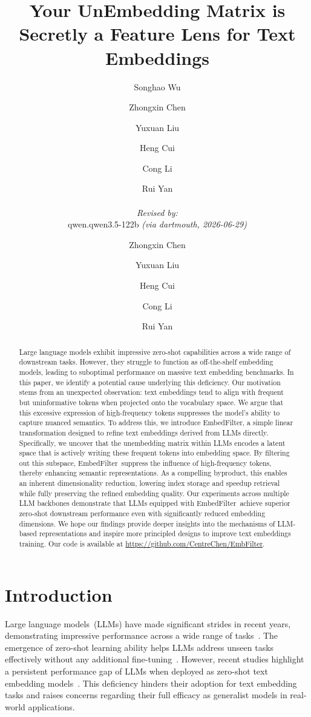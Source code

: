 \documentclass{llmxive}
\title{Your UnEmbedding Matrix is Secretly a Feature Lens for Text Embeddings}
\author{Songhao Wu \and Zhongxin Chen \and Yuxuan Liu \and Heng Cui \and Cong Li \and Rui Yan
  \par\hrule\par
  \textit{Revised by:}\\
  qwen.qwen3.5-122b \textit{(via dartmouth, 2026-06-29)} \and Zhongxin Chen \and Yuxuan Liu \and Heng Cui \and Cong Li \and Rui Yan}
\providecommand{\name}{EmbedFilter}
\begin{document}
\maketitle
\begin{abstract}
Large language models exhibit impressive zero-shot capabilities across a wide range of downstream tasks.
However, they struggle to function as off-the-shelf embedding models, leading to suboptimal performance on massive text embedding benchmarks.
In this paper, we identify a potential cause underlying this deficiency.
Our motivation stems from an unexpected observation: text embeddings tend to align with frequent but uninformative tokens when projected onto the vocabulary space. 
We argue that this excessive expression of high-frequency tokens suppresses the model's ability to capture nuanced semantics.
To address this, we introduce \name, a simple linear transformation designed to refine text embeddings derived from LLMs directly.
Specifically, we uncover that the unembedding matrix within LLMs encodes a latent space that is actively writing these frequent tokens into embedding space.
By filtering out this subspace, \name\ suppress the influence of high-frequency tokens, thereby enhancing semantic representations.
As a compelling byproduct, this enables an inherent dimensionality reduction, lowering index storage and speedup retrieval while fully preserving the refined embedding quality.
Our experiments across multiple LLM backbones demonstrate that LLMs equipped with \name\ achieve superior  zero-shot downstream performance even with significantly reduced embedding dimensions.
We hope our findings provide deeper insights into the mechanisms of LLM-based representations and inspire more principled designs to improve text embeddings training.
Our code is available at \url{https://github.com/CentreChen/EmbFilter}.
\end{abstract}
\section{Introduction}
\label{sec:intro}
Large language models~(LLMs) have made significant strides in recent years, demonstrating impressive performance across a wide range of tasks~\cite{r1,llama3,qwen2.5}.
The emergence of zero-shot learning ability helps LLMs address unseen tasks effectively without any additional fine-tuning~\cite{scaling}.
However, recent studies highlight a persistent performance gap of LLMs when deployed as zero-shot text embedding models~\cite{prompteol,moee,llm2vec}.
This deficiency hinders their adoption for text embedding tasks and raises concerns regarding their full efficacy as generalist models in real-world applications.
\end{document}
